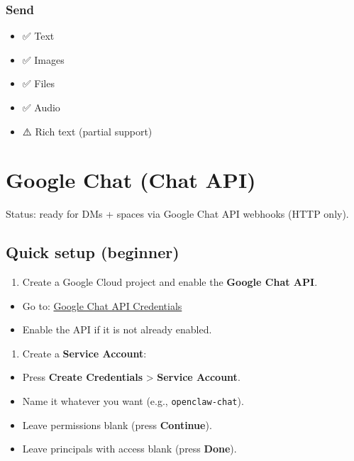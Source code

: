 \subsubsection{Send}


\begin{itemize}
  \item ✅ Text
  \item ✅ Images
  \item ✅ Files
  \item ✅ Audio
  \item ⚠️ Rich text (partial support)
\end{itemize}



\clearpage

\section{Google Chat (Chat API)}


Status: ready for DMs + spaces via Google Chat API webhooks (HTTP only).

\subsection{Quick setup (beginner)}


\begin{enumerate}
  \item Create a Google Cloud project and enable the \textbf{Google Chat API}.
\end{enumerate}

\begin{itemize}
  \item Go to: \href{https://console.cloud.google.com/apis/api/chat.googleapis.com/credentials}{Google Chat API Credentials}
  \item Enable the API if it is not already enabled.
\end{itemize}

\begin{enumerate}
  \item Create a \textbf{Service Account}:
\end{enumerate}

\begin{itemize}
  \item Press \textbf{Create Credentials} > \textbf{Service Account}.
  \item Name it whatever you want (e.g., \texttt{openclaw-chat}).
  \item Leave permissions blank (press \textbf{Continue}).
  \item Leave principals with access blank (press \textbf{Done}).
\end{itemize}

